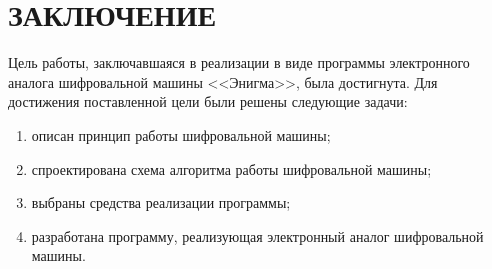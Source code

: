 \chapter*{ЗАКЛЮЧЕНИЕ}

Цель работы, заключавшаяся в реализации в виде программы электронного аналога шифровальной машины <<Энигма>>, была достигнута.
Для достижения поставленной цели были решены следующие задачи:
\begin{enumerate}
	\item описан принцип работы шифровальной машины;
	\item спроектирована схема алгоритма работы шифровальной машины;
	\item выбраны средства реализации программы;
	\item разработана программу, реализующая электронный аналог шифровальной машины.
\end{enumerate}
